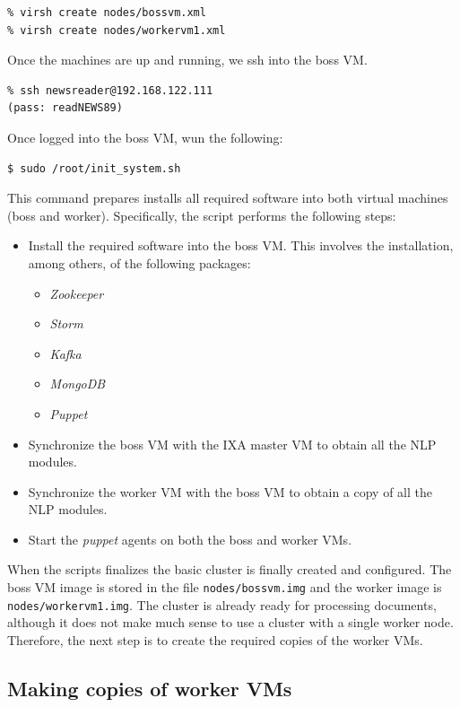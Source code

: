 \documentclass[a4]{article}
\begin{document}
\begin{verbatim}
% virsh create nodes/bossvm.xml
% virsh create nodes/workervm1.xml
\end{verbatim}

Once the machines are up and running, we ssh into the boss VM.

\begin{verbatim}
% ssh newsreader@192.168.122.111
(pass: readNEWS89)
\end{verbatim}

Once logged into the boss VM, wun the following:

\begin{verbatim}
$ sudo /root/init_system.sh
\end{verbatim}

This command prepares installs all required software into both virtual
machines (boss and worker). Specifically, the script performs the following steps:
\begin{itemize}
\item Install the required software into the boss VM. This involves the
  installation, among others, of the following packages:
  \begin{itemize}
  \item \emph{Zookeeper}
  \item \emph{Storm}
  \item \emph{Kafka}
  \item \emph{MongoDB}
  \item \emph{Puppet}
  \end{itemize}
\item Synchronize the boss VM with the IXA master VM to obtain all the NLP
  modules.
\item Synchronize the worker VM with the boss VM to obtain a copy of all the
  NLP modules.
\item Start the \emph{puppet} agents on both the boss and worker VMs.
\end{itemize}

When the scripts finalizes the basic cluster is finally created and
configured. The boss VM image is stored in the file
\texttt{nodes/bossvm.img} and the worker image is
\texttt{nodes/workervm1.img}. The cluster is already ready for processing
documents, although it does not make much sense to use a cluster with a
single worker node. Therefore, the next step is to create the required
copies of the worker VMs.

\subsection{Making copies of worker VMs}
\label{sec:making-copies-worker}
\end{document}
